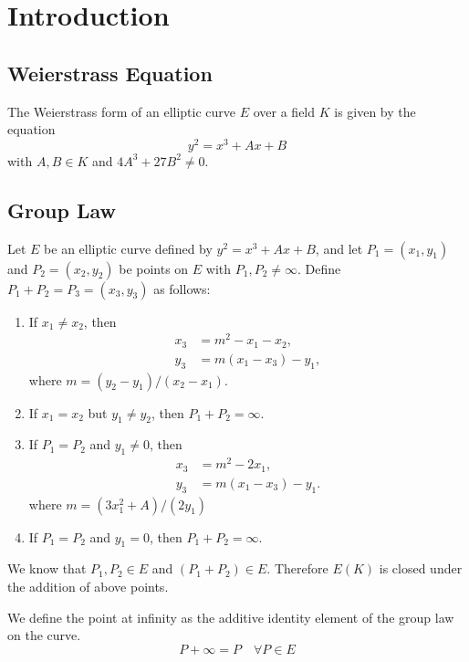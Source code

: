 \chapter{Introduction}\label{chap:intro}
\newtheorem{theorem}{Theorem}[section]
\newtheorem{proposition}{Proposition}[section]
\newtheorem{lemma}{Lemma}[section]
\newtheorem{corollary}{Corollary}[section]

\section{Weierstrass Equation}
The Weierstrass form of an elliptic curve $E$ over a field $K$ is given by the equation
\begin{equation}
y^2 = x^3 + Ax + B 
\end{equation}
with $A, B \in K$ and $4A^3 + 27B^2 \neq 0$.
\section{Group Law} \label{Group_Law}
Let $E$ be an elliptic curve defined by $y^2 = x^3 + Ax + B$, and let $P_1 = (x_1, y_1)$ and $P_2 = (x_2, y_2)$ be points on $E$ with $P_1, P_2 \neq \infty$. Define $P_1 + P_2 = P_3 = (x_3, y_3)$ as follows:
\begin{enumerate}
    \item If $x_1 \neq x_2$, then
    \begin{align*}
        x_3 &= m^2 - x_1 - x_2, \\
        y_3 &= m(x_1 - x_3) - y_1,
    \end{align*}
    where $m = (y_2 - y_1)/(x_2 - x_1)$.
    \item If $x_1 = x_2$ but $y_1 \neq y_2$, then $P_1 + P_2 = \infty$.
    \item If $P_1 = P_2$ and $y_1 \neq 0$, then
    \begin{align*}
        x_3 &= m^2 - 2x_1, \\
        y_3 &= m(x_1 - x_3) - y_1.
    \end{align*}
    where $m = (3x_1^2 + A)/(2y_1)$
    \item If $P_1 = P_2$ and $y_1 = 0$, then $P_1 + P_2 = \infty$.
\end{enumerate}
We know that $P_1, P_2 \in E$ and $(P_1 + P_2) \in E$. Therefore $E(K)$ is closed under the addition of above points.
\begin{definition}
We define the point at infinity as the additive identity element of the group law on the curve.
\begin{equation}
    P + \infty = P \quad \forall P \in E
\end{equation}
\end{definition}

